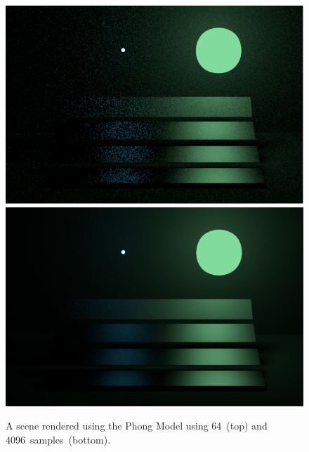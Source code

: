 \documentclass{article}
\begin{document}
\begin{figure}[p]
\centering
\includegraphics[width=\textwidth]{assets/phong64}\\
\includegraphics[width=\textwidth]{assets/phong4096}
\caption{A scene rendered using the Phong Model using 64~(top) and 4096~samples~(bottom).}
\end{figure}

\clearpage
{}

\end{document}
